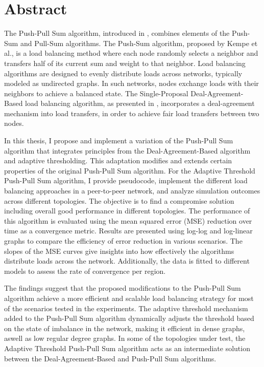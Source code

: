 \chapter*{Abstract}

The Push-Pull Sum algorithm, introduced in \cite{nugroho2023PushPullSumDataAg}, combines elements of the Push-Sum \cite{kempe2003gossipbasedComp} and Pull-Sum algorithms. The Push-Sum algorithm, proposed by Kempe et al., is a load balancing method where each node randomly selects a neighbor and transfers half of its current sum and weight to that neighbor. Load balancing algorithms are designed to evenly distribute loads across networks, typically modeled as undirected graphs. In such networks, nodes exchange loads with their neighbors to achieve a balanced state. The Single-Proposal Deal-Agreement-Based load balancing algorithm, as presented in \cite{Dinitz2023DAB}, incorporates a deal-agreement mechanism into load transfers, in order to achieve fair load transfers between two nodes.

In this thesis, I propose and implement a variation of the Push-Pull Sum algorithm that integrates principles from the Deal-Agreement-Based algorithm and adaptive thresholding. This adaptation modifies and extends certain properties of the original Push-Pull Sum algorithm. For the Adaptive Threshold Push-Pull Sum algorithm, I provide pseudocode, implement the different load balancing approaches in a peer-to-peer network, and analyze simulation outcomes across different topologies. The objective is to find a compromise solution including overall good performance in different topologies. The performance of this algorithm is evaluated using the mean squared error (MSE) reduction over time as a convergence metric. Results are presented using log-log and log-linear graphs to compare the efficiency of error reduction in various scenarios. The slopes of the MSE curves give insights into how effectively the algorithms distribute loads across the network. Additionally, the data is fitted to different models to assess the rate of convergence per region.

The findings suggest that the proposed modifications to the Push-Pull Sum algorithm achieve a more efficient and scalable load balancing strategy for most of the scenarios tested in the experiments. The adaptive threshold mechanism added to the Push-Pull Sum algorithm dynamically adjusts the threshold based on the state of imbalance in the network, making it efficient in dense graphs, aswell as low regular degree graphs. In some of the topologies under test, the Adaptive Threshold Push-Pull Sum algorithm acts as an intermediate solution between the Deal-Agreement-Based and Push-Pull Sum algorithms.
